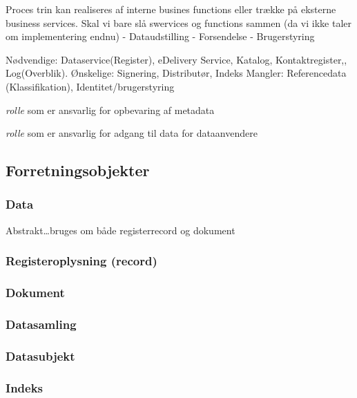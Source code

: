 Proces trin kan realiseres af interne busines functions eller trække på
eksterne business services. Skal vi bare slå swervices og functions
sammen (da vi ikke taler om implementering endnu) - Dataudstilling -
Forsendelse - Brugerstyring

Nødvendige: Dataservice(Register), eDelivery Service, Katalog,
Kontaktregister,, Log(Overblik). Ønskelige: Signering, Distributør,
Indeks Mangler: Referencedata (Klassifikation), Identitet/brugerstyring

\begin{description}
\tightlist
\item[Dataindeksejer]
\emph{rolle} som er ansvarlig for opbevaring af metadata
\item[Datadistributør]
\emph{rolle} som er ansvarlig for adgang til data for dataanvendere
\end{description}

\subsection{Forretningsobjekter}\label{forretningsobjekter}

\subsubsection{Data}\label{data}

Abstrakt\ldots{}bruges om både registerrecord og dokument

\subsubsection{Registeroplysning
(record)}\label{registeroplysning-record}

\subsubsection{Dokument}\label{dokument}

\subsubsection{Datasamling}\label{datasamling}

\subsubsection{Datasubjekt}\label{datasubjekt}

\subsubsection{Indeks}\label{indeks}

